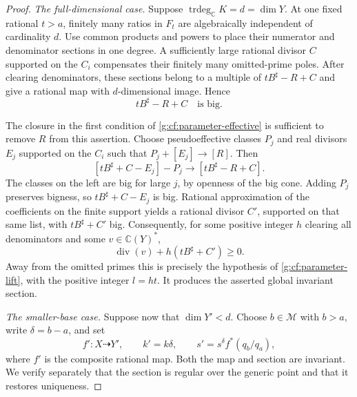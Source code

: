 \begin{proof}
\emph{The full-dimensional case.}
Suppose \(\operatorname{trdeg}_{\mathbb C}K=d=\dim Y\).
At one fixed rational \(t>a\), finitely many ratios in \(F_t\)
are algebraically independent of cardinality \(d\).  Use common
products and powers to place their numerator and denominator
sections in one degree.  A sufficiently large rational divisor
\(C\) supported on the \(C_i\) compensates their finitely many
omitted-prime poles.  After clearing denominators, these sections
belong to a multiple of \(tB^\sharp-R+C\) and give a rational map
with \(d\)-dimensional image.  Hence
\begin{equation}\label{g:cf:parameter-big}
 tB^\sharp-R+C\quad\text{is big}.
\end{equation}

The closure in the first condition of
\eqref{g:cf:parameter-effective} is sufficient to remove \(R\)
from this assertion.  Choose pseudoeffective classes \(P_j\) and
real divisors \(E_j\) supported on the \(C_i\) such that
\(P_j+[E_j]\to[R]\).  Then
\[
 [tB^\sharp+C-E_j]-P_j
 \longrightarrow [tB^\sharp-R+C].
\]
The classes on the left are big for large \(j\), by openness of
the big cone.  Adding \(P_j\) preserves bigness, so
\(tB^\sharp+C-E_j\) is big.  Rational approximation of the
coefficients on the finite support yields a rational divisor
\(C'\), supported on that same list, with \(tB^\sharp+C'\) big.
Consequently, for some positive integer \(h\) clearing all
denominators and some \(v\in\mathbb C(Y)^*\),
\[
 \operatorname{div}(v)+h(tB^\sharp+C')\geq0.
\]
Away from the omitted primes this is precisely the hypothesis of
\eqref{g:cf:parameter-lift}, with the positive integer \(l=ht\).
It produces the asserted global invariant section.

\emph{The smaller-base case.}
Suppose now that \(\dim Y'<d\).  Choose \(b\in\mathcal M\) with
\(b>a\), write \(\delta=b-a\), and set
\begin{equation}\label{g:cf:parameter-new-section}
 f':X\dashrightarrow Y',\qquad
 k'=k\delta,\qquad
 s'=s^\delta f^*(q_b/q_a),
\end{equation}
where \(f'\) is the composite rational map.  Both the map and
section are invariant.  We verify separately that the section is
regular over the generic point and that it restores uniqueness.


\end{proof}
